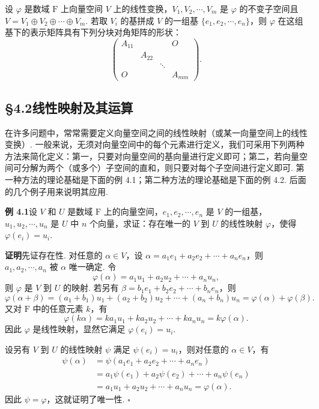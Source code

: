 \documentclass[UTF8, 12pt, fontset=fandol, oneside]{ctexart}
\begin{document}
设 $\varphi$ 是数域 $\mathrm{F}$ 上向量空间 $V$ 上的线性变换，$V_1,V_2,\cdots,V_m$ 是 $\varphi$ 的不变子空间且 $V=V_1\oplus V_2\oplus\cdots\oplus V_m$. 若取 $V_i$ 的基拼成 $V$ 的一组基 $\{e_1,e_2,\cdots,e_n\}$，则 $\varphi$ 在这组基下的表示矩阵具有下列分块对角矩阵的形状：
\[
\left(\begin{array}{cccc}
A_{11} &        &        & O\\
       & A_{22} &        &  \\
       &        & \ddots &  \\
O      &        &        & A_{mm}
\end{array}\right).
\]

\subsection*{§4.2\quad 线性映射及其运算}

在许多问题中，常常需要定义向量空间之间的线性映射（或某一向量空间上的线性变换）. 一般来说，无须对向量空间中的每个元素进行定义，我们可采用下列两种方法来简化定义：第一，只要对向量空间的基向量进行定义即可；第二，若向量空间可分解为两个（或多个）子空间的直和，则只要对每个子空间进行定义即可. 第一种方法的理论基础是下面的例 4.1；第二种方法的理论基础是下面的例 4.2. 后面的几个例子用来说明其应用.

\noindent\textbf{例 4.1}\quad 设 $V$ 和 $U$ 是数域 $\mathrm{F}$ 上的向量空间，$e_1,e_2,\cdots,e_n$ 是 $V$ 的一组基，$u_1,u_2,\cdots,u_n$ 是 $U$ 中 $n$ 个向量，求证：存在唯一的 $V$ 到 $U$ 的线性映射 $\varphi$，使得 $\varphi(e_i)=u_i$.

\noindent\textbf{证明}\quad 先证存在性. 对任意的 $\alpha\in V$，设 $\alpha=a_1e_1+a_2e_2+\cdots+a_ne_n$，则 $a_1,a_2,\cdots,a_n$ 被 $\alpha$ 唯一确定. 令
\[
\varphi(\alpha)=a_1u_1+a_2u_2+\cdots+a_nu_n,
\]
则 $\varphi$ 是 $V$ 到 $U$ 的映射. 若另有 $\beta=b_1e_1+b_2e_2+\cdots+b_ne_n$，则
\[
\varphi(\alpha+\beta)=(a_1+b_1)u_1+(a_2+b_2)u_2+\cdots+(a_n+b_n)u_n
=\varphi(\alpha)+\varphi(\beta).
\]
又对 $\mathrm{F}$ 中的任意元素 $k$，有
\[
\varphi(k\alpha)=ka_1u_1+ka_2u_2+\cdots+ka_nu_n=k\varphi(\alpha).
\]
因此 $\varphi$ 是线性映射，显然它满足 $\varphi(e_i)=u_i$.

设另有 $V$ 到 $U$ 的线性映射 $\psi$ 满足 $\psi(e_i)=u_i$，则对任意的 $\alpha\in V$，有
\[
\begin{aligned}
\psi(\alpha)
&=\psi(a_1e_1+a_2e_2+\cdots+a_ne_n)\\
&=a_1\psi(e_1)+a_2\psi(e_2)+\cdots+a_n\psi(e_n)\\
&=a_1u_1+a_2u_2+\cdots+a_nu_n=\varphi(\alpha).
\end{aligned}
\]
因此 $\psi=\varphi$，这就证明了唯一性. $\square$
\end{document}

